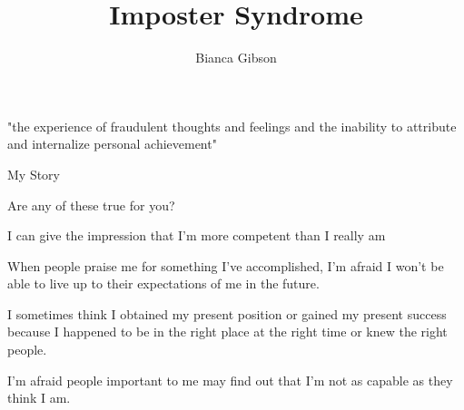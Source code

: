 \documentclass[aspectratio=169]{beamer}
\title{Imposter Syndrome}
\author{Bianca Gibson}
\institute{Pycon AU 2016}
\date{}
\begin{document}
\frame{\titlepage}

\begin{frame}
  \begin{center}
    \Huge "the experience of fraudulent thoughts and feelings and the inability to attribute and internalize personal achievement"
  \end{center}
\end{frame}

\begin{frame}
  \begin{center}
    \Huge My Story
  \end{center}
\end{frame}

\begin{frame}
  \begin{center}
    \Huge Are any of these true for you?
  \end{center}
\end{frame}

\begin{frame}
  \begin{center}
    \Huge  I can give the impression that I’m more competent than I really am
  \end{center}
\end{frame}

\begin{frame}
  \begin{center}
    \Huge  When  people  praise  me  for  something  I’ve  accomplished,  I’m  afraid  I  won’t  be able to live up to their expectations of me in the future.
  \end{center}
\end{frame}

\begin{frame}
  \begin{center}
    \Huge  I sometimes think I obtained my present position or gained my present success because I happened to be in the right
    place at the right time or knew the right people.
  \end{center}
\end{frame}

\begin{frame}
  \begin{center}
    \Huge  I’m  afraid  people  important  to  me  may  find  out  that  I’m  not  as  capable  as  they  think  I  am.
  \end{center}
\end{frame}
\end{document}
